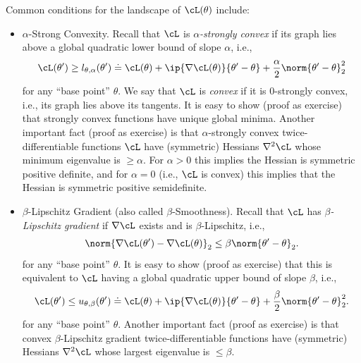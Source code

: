 \documentclass[../../book-main.tex]{subfiles}
\begin{document}
Common conditions for the landscape of \(\cL(\theta)\) include:
\begin{itemize}
    \item \(\alpha\)-Strong Convexity. Recall that \(\cL\) is
        \textit{\(\alpha\)-strongly convex} if its graph lies above a
        global quadratic lower bound of slope \(\alpha\), i.e.,
        \begin{equation}
            \cL(\theta^{\prime}) \geq l_{\theta,
            \alpha}(\theta^{\prime}) \doteq \cL(\theta) + \ip{\nabla
            \cL(\theta)}{\theta^{\prime} - \theta} +
            \frac{\alpha}{2}\norm{\theta^{\prime} - \theta}_{2}^{2}
        \end{equation}
        for any ``base point'' \(\theta\). We say that \(\cL\) is
        \textit{convex} if it is \(0\)-strongly convex, i.e., its
        graph lies above its tangents. It is easy to show (proof as
        exercise) that strongly convex functions have unique global
        minima. Another important fact (proof as exercise) is that
        \(\alpha\)-strongly convex twice-differentiable functions
        \(\cL\) have (symmetric) Hessians \(\nabla^{2}\cL\) whose
        minimum eigenvalue is \(\geq \alpha\). For \(\alpha > 0\)
        this implies the Hessian is symmetric positive definite, and
        for \(\alpha = 0\) (i.e., \(\cL\) is convex) this implies
        that the Hessian is symmetric positive semidefinite.
    \item \(\beta\)-Lipschitz Gradient (also called
        \(\beta\)-Smoothness). Recall that \(\cL\) has
        \textit{\(\beta\)-Lipschitz gradient} if \(\nabla \cL\)
        exists and is \(\beta\)-Lipschitz, i.e.,
        \begin{equation}
            \norm{\nabla \cL(\theta^{\prime}) - \nabla
            \cL(\theta)}_{2} \leq \beta \norm{\theta^{\prime} - \theta}_{2}.
        \end{equation}
        for any ``base point'' \(\theta\).  It is easy to show (proof
        as exercise) that this is equivalent to \(\cL\) having a
        global quadratic upper bound of slope \(\beta\), i.e.,
        \begin{equation}
            \cL(\theta^{\prime}) \leq u_{\theta,
            \beta}(\theta^{\prime}) \doteq \cL(\theta) + \ip{\nabla
            \cL(\theta)}{\theta^{\prime} - \theta} +
            \frac{\beta}{2}\norm{\theta^{\prime} - \theta}_{2}^{2}.
        \end{equation}
        for any ``base point'' \(\theta\).  Another important fact
        (proof as exercise) is that convex \(\beta\)-Lipschitz
        gradient twice-differentiable functions have (symmetric)
        Hessians \(\nabla^{2}\cL\) whose largest eigenvalue is \(\leq \beta\).
\end{itemize}
\end{document}
